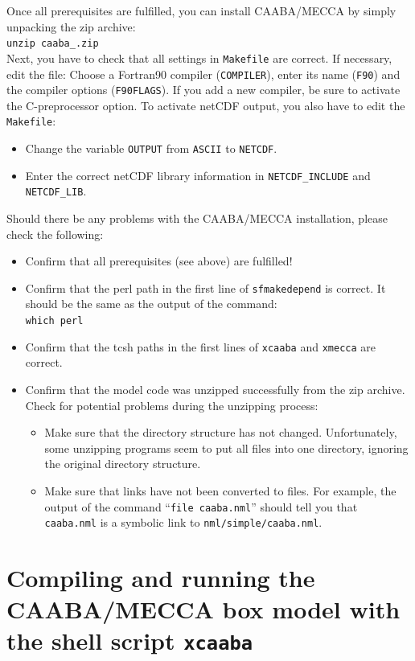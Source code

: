 \documentclass[twoside]{article}
\def\nosep{\setlength\parsep{0mm}\setlength\topsep{0mm}\setlength\itemsep{0mm}}
\begin{document}
Once all prerequisites are fulfilled, you can install CAABA/MECCA by
simply unpacking the zip archive:\\[2mm]
{\tt unzip caaba\_\meccaversion.zip}\\[2mm]

Next, you have to check that all settings in \verb|Makefile| are
correct. If necessary, edit the file: Choose a Fortran90 compiler
(\verb|COMPILER|), enter its name (\verb|F90|) and the compiler options
(\verb|F90FLAGS|). If you add a new compiler, be sure to activate the
C-preprocessor option. To activate netCDF output, you also have to edit
the \verb|Makefile|:
\begin{itemize}\nosep
\item Change the variable \verb|OUTPUT| from \verb|ASCII| to
  \verb|NETCDF|.
\item Enter the correct netCDF library information in
  \verb|NETCDF_INCLUDE| and \verb|NETCDF_LIB|.
\end{itemize}

Should there be any problems with the CAABA/MECCA installation, please
check the following:
\begin{itemize}\nosep
\item Confirm that all prerequisites (see above) are fulfilled!
\item Confirm that the perl path in the first line of
  \verb|sfmakedepend| is correct. It should be the same as the output of
  the command:\\
  \verb|which perl|
\item Confirm that the tcsh paths in the first lines of
  \verb|xcaaba| and \verb|xmecca| are correct.
\item Confirm that the model code was unzipped successfully from the zip
  archive. Check for potential problems during the unzipping process:
  \begin{itemize}
  \item Make sure that the directory structure has not changed.
    Unfortunately, some unzipping programs seem to put all files into
    one directory, ignoring the original directory structure.
  \item Make sure that links have not been converted to files. For
    example, the output of the command ``\verb|file caaba.nml|'' should
    tell you that \verb|caaba.nml| is a symbolic link to
    \verb|nml/simple/caaba.nml|.
  \end{itemize}
\end{itemize}

\section{Compiling and running the CAABA/MECCA box model with the shell
  script {\tt xcaaba}}
\label{sec:execute}
\end{document}
